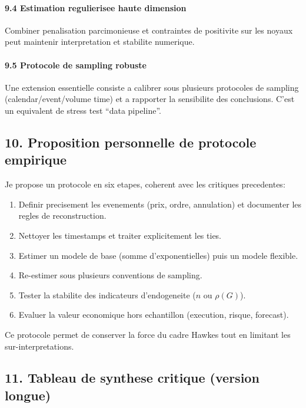 \documentclass[11pt,a4paper]{article}
\begin{document}
\paragraph{9.4 Estimation regulierisee haute dimension}
Combiner penalisation parcimonieuse et contraintes de positivite sur les noyaux peut maintenir interpretation et stabilite numerique.

\paragraph{9.5 Protocole de sampling robuste}
Une extension essentielle consiste a calibrer sous plusieurs protocoles de sampling (calendar/event/volume time) et a rapporter la sensibilite des conclusions. C'est un equivalent de stress test \enquote{data pipeline}.

\subsection*{10. Proposition personnelle de protocole empirique}

Je propose un protocole en six etapes, coherent avec les critiques precedentes:
\begin{enumerate}[leftmargin=1.2cm]
    \item Definir precisement les evenements (prix, ordre, annulation) et documenter les regles de reconstruction.
    \item Nettoyer les timestamps et traiter explicitement les ties.
    \item Estimer un modele de base (somme d'exponentielles) puis un modele flexible.
    \item Re-estimer sous plusieurs conventions de sampling.
    \item Tester la stabilite des indicateurs d'endogeneite ($n$ ou $\rho(G)$).
    \item Evaluer la valeur economique hors echantillon (execution, risque, forecast).
\end{enumerate}

Ce protocole permet de conserver la force du cadre Hawkes tout en limitant les sur-interpretations.

\subsection*{11. Tableau de synthese critique (version longue)}
\end{document}
